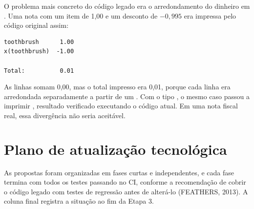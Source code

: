 O problema mais concreto do código legado era o arredondamento do dinheiro em . Uma nota com um item de 1,00 e um desconto de $-0{,}995$ era impressa pelo código original assim:
\begin{lstlisting}[language={}]
toothbrush      1.00
x(toothbrush)  -1.00

Total:          0.01
\end{lstlisting}
As linhas somam 0,00, mas o total impresso era 0,01, porque cada linha era arredondada separadamente a partir de um . Com o tipo , o mesmo caso passou a imprimir , resultado verificado executando o código atual. Em uma nota fiscal real, essa divergência não seria aceitável.

\section{Plano de atualização tecnológica}

As propostas foram organizadas em fases curtas e independentes, e cada fase termina com todos os testes passando no CI, conforme a recomendação de cobrir o código legado com testes de regressão antes de alterá-lo (FEATHERS, 2013). A coluna final registra a situação ao fim da Etapa 3.

